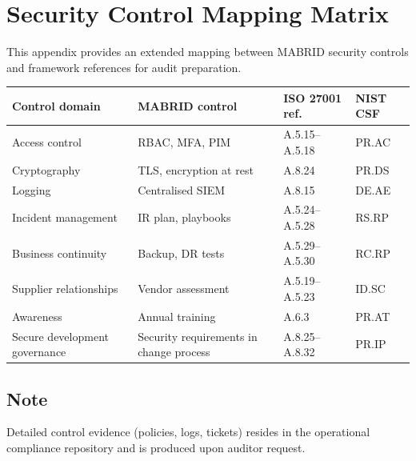 \chapter{Security Control Mapping Matrix}
\label{app:control-matrix}

This appendix provides an extended mapping between MABRID security controls and framework references for audit preparation.

\begin{landscape}
\begin{longtable}{@{}p{3.5cm}p{4.5cm}p{4cm}p{4cm}@{}}
\toprule
\textbf{Control domain} & \textbf{MABRID control} & \textbf{ISO 27001 ref.} & \textbf{NIST CSF} \\
\midrule
\endhead
Access control & RBAC, MFA, PIM & A.5.15--A.5.18 & PR.AC \\
Cryptography & TLS, encryption at rest & A.8.24 & PR.DS \\
Logging & Centralised SIEM & A.8.15 & DE.AE \\
Incident management & IR plan, playbooks & A.5.24--A.5.28 & RS.RP \\
Business continuity & Backup, DR tests & A.5.29--A.5.30 & RC.RP \\
Supplier relationships & Vendor assessment & A.5.19--A.5.23 & ID.SC \\
Awareness & Annual training & A.6.3 & PR.AT \\
Secure development governance & Security requirements in change process & A.8.25--A.8.32 & PR.IP \\
\bottomrule
\end{longtable}
\end{landscape}

\section*{Note}
Detailed control evidence (policies, logs, tickets) resides in the operational compliance repository and is produced upon auditor request.
